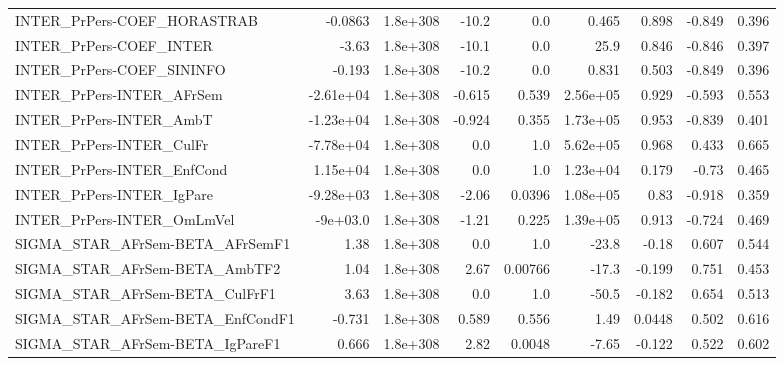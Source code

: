 \begin{tabular}{lrrrrrrrr}
INTER\_PrPers-COEF\_HORASTRAB           &     -0.0863 &     1.8e+308 &   -10.2 &      0.0 &      0.465 &       0.898 &       -0.849 &         0.396 \\
INTER\_PrPers-COEF\_INTER               &       -3.63 &     1.8e+308 &   -10.1 &      0.0 &       25.9 &       0.846 &       -0.846 &         0.397 \\
INTER\_PrPers-COEF\_SININFO             &      -0.193 &     1.8e+308 &   -10.2 &      0.0 &      0.831 &       0.503 &       -0.849 &         0.396 \\
INTER\_PrPers-INTER\_AFrSem             &   -2.61e+04 &     1.8e+308 &  -0.615 &    0.539 &   2.56e+05 &       0.929 &       -0.593 &         0.553 \\
INTER\_PrPers-INTER\_AmbT               &   -1.23e+04 &     1.8e+308 &  -0.924 &    0.355 &   1.73e+05 &       0.953 &       -0.839 &         0.401 \\
INTER\_PrPers-INTER\_CulFr              &   -7.78e+04 &     1.8e+308 &     0.0 &      1.0 &   5.62e+05 &       0.968 &        0.433 &         0.665 \\
INTER\_PrPers-INTER\_EnfCond            &    1.15e+04 &     1.8e+308 &     0.0 &      1.0 &   1.23e+04 &       0.179 &        -0.73 &         0.465 \\
INTER\_PrPers-INTER\_IgPare             &   -9.28e+03 &     1.8e+308 &   -2.06 &   0.0396 &   1.08e+05 &        0.83 &       -0.918 &         0.359 \\
INTER\_PrPers-INTER\_OmLmVel            &    -9e+03.0 &     1.8e+308 &   -1.21 &    0.225 &   1.39e+05 &       0.913 &       -0.724 &         0.469 \\
SIGMA\_STAR\_AFrSem-BETA\_AFrSemF1       &        1.38 &     1.8e+308 &     0.0 &      1.0 &      -23.8 &       -0.18 &        0.607 &         0.544 \\
SIGMA\_STAR\_AFrSem-BETA\_AmbTF2         &        1.04 &     1.8e+308 &    2.67 &  0.00766 &      -17.3 &      -0.199 &        0.751 &         0.453 \\
SIGMA\_STAR\_AFrSem-BETA\_CulFrF1        &        3.63 &     1.8e+308 &     0.0 &      1.0 &      -50.5 &      -0.182 &        0.654 &         0.513 \\
SIGMA\_STAR\_AFrSem-BETA\_EnfCondF1      &      -0.731 &     1.8e+308 &   0.589 &    0.556 &       1.49 &      0.0448 &        0.502 &         0.616 \\
SIGMA\_STAR\_AFrSem-BETA\_IgPareF1       &       0.666 &     1.8e+308 &    2.82 &   0.0048 &      -7.65 &      -0.122 &        0.522 &         0.602 \\

\end{tabular}
